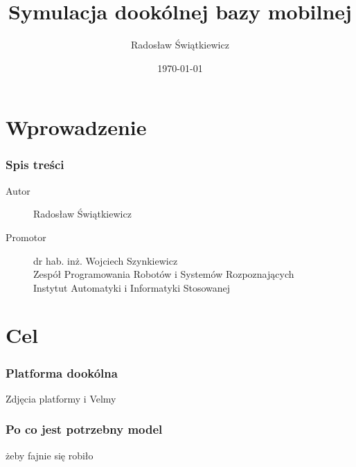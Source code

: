 \documentclass{beamer}
\begin{document}
  \section{Wprowadzenie}
  \begin{frame}
    \title[Omnivelma]{Symulacja dookólnej bazy mobilnej}
	\author{Radosław Świątkiewicz}
	\date{\today}
	\titlepage
  \end{frame}
  \begin{frame}
	\frametitle{Spis treści}
	\tableofcontents[currentsection]
  \end{frame}
  \begin{frame}
	\begin{description}
	 \item[Autor] Radosław Świątkiewicz
	 \item[Promotor] dr hab. inż. Wojciech Szynkiewicz \\ Zespół Programowania Robotów i Systemów Rozpoznających \\ Instytut Automatyki i Informatyki Stosowanej
	\end{description}
  \end{frame}
  
  \section{Cel}
  \begin{frame}
	\frametitle{Platforma dookólna}
	Zdjęcia platformy i Velmy
  \end{frame}
  \begin{frame}
	\frametitle{Po co jest potrzebny model}
	żeby fajnie się robiło
  \end{frame}
\end{document}
